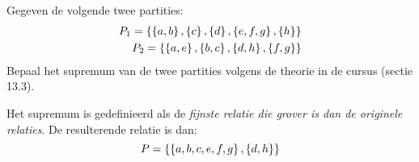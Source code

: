 \documentclass{article}
\begin{document}
\begin{question}
Gegeven de volgende twee partities:
\begin{eqnarray}
P_1=\left\{ \left\{ a,b \right\},\left\{ c \right\},\left\{ d \right\},\left\{ e,f,g \right\},\left\{ h \right\}  \right\}\\
P_2=\left\{ \left\{ a,e \right\},\left\{ b,c \right\},\left\{ d,h \right\},\left\{ f,g \right\}  \right\}
\end{eqnarray}
Bepaal het supremum van de twee partities volgens de theorie in de cursus (sectie 13.3).
\end{question}
\begin{answer}
Het supremum is gedefinieerd als de \emph{fijnste relatie die grover is dan de originele relaties}. De resulterende relatie is dan:
\begin{equation}
P=\left\{ \left\{ a,b,c,e,f,g \right\},\left\{ d,h \right\}  \right\}
\end{equation}
\end{answer}
\end{document}
